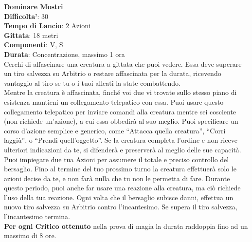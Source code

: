 \begin{multicols}{2}
\medskip\textbf{Dominare Mostri}\\
\textbf{Difficolta'}: 30\\
\textbf{Tempo di Lancio}: 2 Azioni\\
\textbf{Gittata}: 18 metri\\
\textbf{Componenti}: V, S\\
\textbf{Durata}: Concentrazione, massimo 1 ora\\
Cerchi di affascinare una creatura a gittata che puoi vedere. Essa deve superare un tiro salvezza su
Arbitrio o restare affascinata per la durata, ricevendo vantaggio al tiro se tu o i tuoi alleati la state combattendo.\\
Mentre la creatura è affascinata, finché voi due vi trovate sullo stesso piano di esistenza mantieni un collegamento telepatico con essa. Puoi usare questo collegamento telepatico per inviare comandi alla creatura mentre sei cosciente (non richiede un’azione), a cui essa obbedirà al suo meglio. Puoi specificare un corso d’azione semplice e generico, come “Attacca quella creatura”, “Corri laggiù”, o “Prendi quell’oggetto”. Se la creatura completa l’ordine e non riceve ulteriori indicazioni da te, si difenderà e preserverà al meglio delle sue capacità.\\
Puoi impiegare due tua Azioni per assumere il totale e preciso controllo del bersaglio. Fino al termine del tuo prossimo turno la creatura effettuerà solo le azioni decise da te, e non farà nulla che tu non le permetta di fare. Durante questo periodo, puoi anche far usare una reazione alla creatura, ma ciò richiede l’uso della tua reazione. Ogni volta che il bersaglio subisce danni, effettua un nuovo tiro salvezza su Arbitrio contro l’incantesimo. Se supera il tiro salvezza, l’incantesimo termina.\\
\textbf{Per ogni Critico ottenuto} nella prova di magia la durata raddoppia fino ad un massimo di 8 ore.


\end{multicols}

